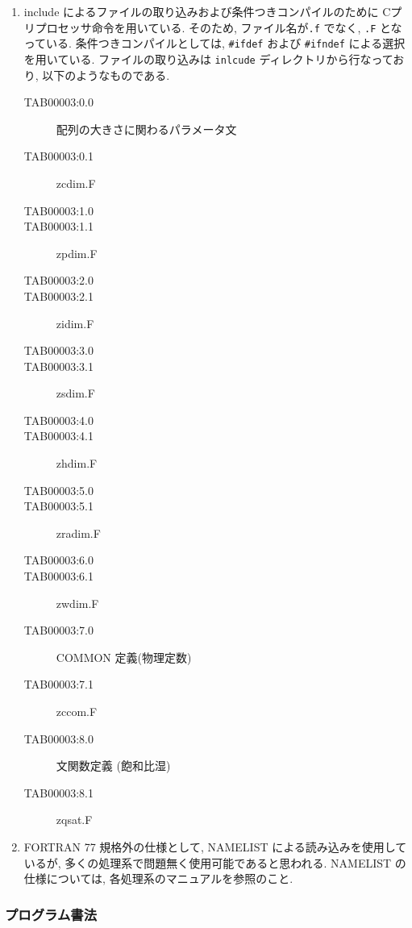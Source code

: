 \begin{enumerate}
\item include によるファイルの取り込みおよび条件つきコンパイルのために
Cプリプロセッサ命令を用いている. 
そのため, ファイル名が{\tt *.f} でなく, {\tt *.F} となっている.
条件つきコンパイルとしては, 
{\tt \#ifdef} および {\tt \#ifndef} による選択を用いている.
ファイルの取り込みは {\tt inlcude} ディレクトリから行なっており,
以下のようなものである. 
\begin{center}
  \begin{description}
\item[TAB00003:0.0] 配列の大きさに関わるパラメータ文
\item[TAB00003:0.1] zcdim.F
\item[TAB00003:1.0] 
\item[TAB00003:1.1] zpdim.F
\item[TAB00003:2.0] 
\item[TAB00003:2.1] zidim.F
\item[TAB00003:3.0] 
\item[TAB00003:3.1] zsdim.F
\item[TAB00003:4.0] 
\item[TAB00003:4.1] zhdim.F
\item[TAB00003:5.0] 
\item[TAB00003:5.1] zradim.F
\item[TAB00003:6.0] 
\item[TAB00003:6.1] zwdim.F
\item[TAB00003:7.0] COMMON 定義(物理定数)
\item[TAB00003:7.1] zccom.F
\item[TAB00003:8.0] 文関数定義 (飽和比湿)
\item[TAB00003:8.1] zqsat.F
\end{description}
\end{center}

\item FORTRAN 77 規格外の仕様として,
  NAMELIST による読み込みを使用しているが,
  多くの処理系で問題無く使用可能であると思われる.
  NAMELIST の仕様については, 各処理系のマニュアルを参照のこと.

\end{enumerate}


\subsubsection{プログラム書法}

